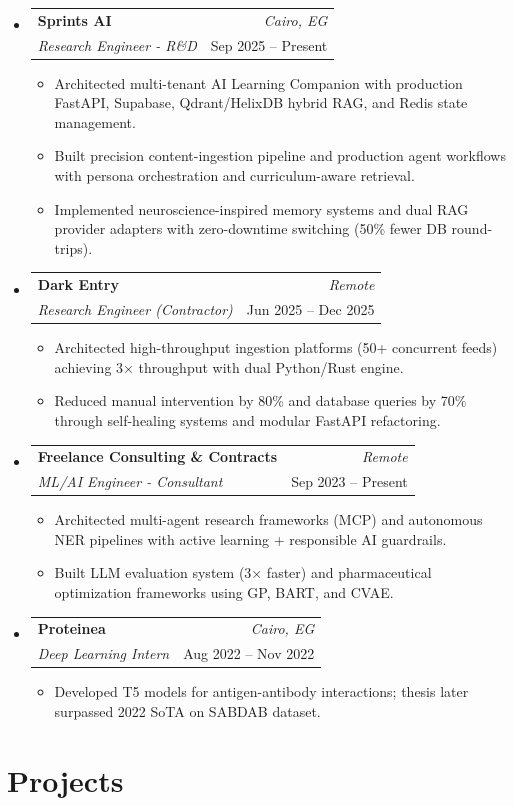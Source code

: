 \documentclass[10pt, letterpaper]{extarticle}
\makeatletter
\newcommand{\resumeItem}[1]{\item{#1}}
\newcommand{\resumeSubheading}[4]{
  \item
    \begin{tabular*}{1.0\textwidth}[t]{l@{\extracolsep{\fill}}r}
      \textbf{#1} & \textit{#4} \\
      \textit{#3} & #2 \\
    \end{tabular*}\vspace{1pt}
}
\makeatother
\begin{document}
\begin{itemize}[label={}, leftmargin=0in]

    \resumeSubheading{Sprints AI}{Sep 2025 – Present}{Research Engineer - R\&D}{Cairo, EG}
    \begin{itemize}[label={--}]
      \resumeItem{Architected multi-tenant AI Learning Companion with production FastAPI, Supabase, Qdrant/HelixDB hybrid RAG, and Redis state management.}
      \resumeItem{Built precision content-ingestion pipeline and production agent workflows with persona orchestration and curriculum-aware retrieval.}
      \resumeItem{Implemented neuroscience-inspired memory systems and dual RAG provider adapters with zero-downtime switching (50\% fewer DB round-trips).}
    \end{itemize}

    \resumeSubheading{Dark Entry}{Jun 2025 – Dec 2025}{Research Engineer (Contractor)}{Remote}
    \begin{itemize}[label={--}]
      \resumeItem{Architected high-throughput ingestion platforms (50+ concurrent feeds) achieving 3× throughput with dual Python/Rust engine.}
      \resumeItem{Reduced manual intervention by 80\% and database queries by 70\% through self-healing systems and modular FastAPI refactoring.}
    \end{itemize}

    \resumeSubheading{Freelance Consulting \& Contracts}{Sep 2023 – Present}{ML/AI Engineer - Consultant}{Remote}
    \begin{itemize}[label={--}]
      \resumeItem{Architected multi-agent research frameworks (MCP) and autonomous NER pipelines with active learning + responsible AI guardrails.}
      \resumeItem{Built LLM evaluation system (3× faster) and pharmaceutical optimization frameworks using GP, BART, and CVAE.}
    \end{itemize}

    \resumeSubheading{Proteinea}{Aug 2022 – Nov 2022}{Deep Learning Intern}{Cairo, EG}
    \begin{itemize}[label={--}]
      \resumeItem{Developed T5 models for antigen-antibody interactions; thesis later surpassed 2022 SoTA on SABDAB dataset.}
    \end{itemize}

\end{itemize}

\section{Projects}
\end{document}
